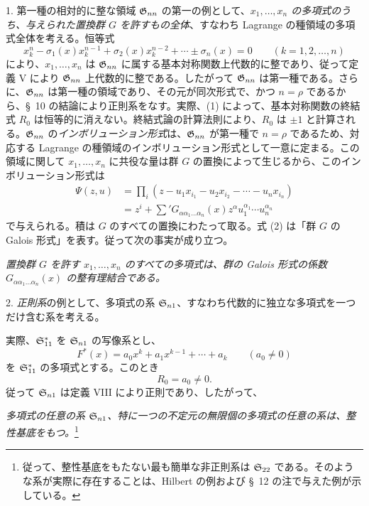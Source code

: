 \documentclass[11pt]{jlreq}
\begin{document}
1. 第一種の相対的に整な領域 $\mathfrak{G}_{nn}$ の第一の例として、\emph{$x_1,\ldots,x_n$ の多項式のうち、与えられた置換群 $G$ を許すもの全体}、すなわち Lagrange の種領域の多項式全体を考える。恒等式
\begin{equation}
  x_k^n-\sigma_1(x)x_k^{n-1}+\sigma_2(x)x_k^{n-2}+\cdots\pm\sigma_n(x)=0
  \qquad(k=1,2,
\ldots,n)
\tag{1}
\end{equation}
により、$x_1,\ldots,x_n$ は $\mathfrak{G}_{nn}$ に属する基本対称関数上代数的に整であり、従って定義 V により $\mathfrak{G}_{nn}$ 上代数的に整である。したがって $\mathfrak{G}_{nn}$ は第一種である。さらに、$\mathfrak{G}_{nn}$ は第一種の領域であり、その元が同次形式で、かつ $n=\rho$ であるから、\S\ 10 の結論により正則系をなす。実際、(1) によって、基本対称関数の終結式 $R_0$ は恒等的に消えない。終結式論の計算法則により、$R_0$ は $\pm1$ と計算される。$\mathfrak{G}_{nn}$ の\emph{インボリューション形式}は、$\mathfrak{G}_{nn}$ が第一種で $n=\rho$ であるため、対応する Lagrange の種領域のインボリューション形式として一意に定まる。この領域に関して $x_1,\ldots,x_n$ に共役な量は群 $G$ の置換によって生じるから、このインボリューション形式は
\begin{equation}
\begin{aligned}
  \Psi(z,u)&=\prod_i
  (z-u_1x_{i_1}-u_2x_{i_2}-\cdots-u_nx_{i_n})\\
  &=z^i+\sum{}'G_{\alpha\alpha_1\ldots\alpha_n}(x)
  z^\alpha u_1^{\alpha_1}\cdots u_n^{\alpha_n}
\end{aligned}
\tag{2}
\end{equation}
で与えられる。積は $G$ のすべての置換にわたって取る。式 (2) は「群 $G$ の Galois 形式」を表す。従って次の事実が成り立つ。

\emph{置換群 $G$ を許す $x_1,\ldots,x_n$ のすべての多項式は、群の Galois 形式の係数 $G_{\alpha\alpha_1\ldots\alpha_n}(x)$ の整有理結合である。}

2. \emph{正則系}の例として、多項式の系 $\mathfrak{S}_{n1}$、すなわち代数的に独立な多項式を一つだけ含む系を考える。

実際、$\mathfrak{S}^*_{11}$ を $\mathfrak{S}_{n1}$ の写像系とし、
\[
  F^*(x)=a_0x^k+a_1x^{k-1}+\cdots+a_k\qquad(a_0\ne0)
\]
を $\mathfrak{S}^*_{11}$ の多項式とする。このとき
\begin{equation}
  R_0=a_0\ne0.
\tag{3}
\end{equation}
従って $\mathfrak{S}_{n1}$ は定義 VIII により正則であり、したがって、

\emph{多項式の任意の系 $\mathfrak{S}_{n1}$、特に一つの不定元の無限個の多項式の任意の系は、整性基底をもつ。}\footnote{従って、整性基底をもたない最も簡単な非正則系は $\mathfrak{S}_{22}$ である。そのような系が実際に存在することは、Hilbert の例および \S\ 12 の注で与えた例が示している。}
\end{document}
